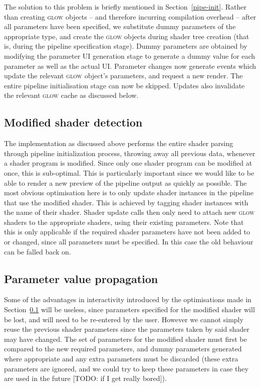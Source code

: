 \documentclass[12pt,twoside,notitlepage]{report}
\begin{document}
The solution to this problem is briefly mentioned in Section~\ref{pipe-init}. Rather than creating \textsc{glow} objects -- and therefore incurring compilation overhead -- after all parameters have been specified, we substitute dummy parameters of the appropriate type, and create the \textsc{glow} objects during shader tree creation (that is, during the pipeline specification stage). Dummy parameters are obtained by modifying the parameter UI generation stage to generate a dummy value for each parameter as well as the actual UI. Parameter changes now generate events which update the relevant \textsc{glow} object's parameters, and request a new render. The entire pipeline initialisation stage can now be skipped. Updates also invalidate the relevant \textsc{glow} cache as discussed below.

\subsection{Modified shader detection}
\label{msd}
The implementation as discussed above performs the entire shader parsing through pipeline initialization process, throwing away all previous data, whenever a shader program is modified. Since only one shader program can be modified at once, this is sub-optimal. This is particularly important since we would like to be able to render a new preview of the pipeline output as quickly as possible. The most obvious optimisation here is to only update shader instances in the pipeline that use the modified shader. This is achieved by tagging shader instances with the name of their shader. Shader update calls then only need to attach new \textsc{glow} shaders to the appropriate shaders, using their existing parameters. Note that this is only applicable if the required shader parameters have not been added to or changed, since all parameters must be specified. In this case the old behaviour can be falled back on.

\subsection{Parameter value propagation}
Some of the advantages in interactivity introduced by the optimisations made in Section~\ref{msd} will be useless, since parameters specified for the modified shader will be lost, and will need to be re-entered by the user. However we cannot simply reuse the previous shader parameters since the parameters taken by said shader may have changed. The set of parameters for the modified shader must first be compared to the new required parameters, and dummy parameters generated where appropriate and any extra parameters must be discarded (these extra parameters are ignored, and we could try to keep these parameters in case they are used in the future [TODO: if I get really bored]). 
\end{document}
